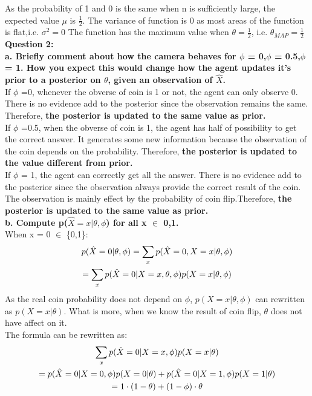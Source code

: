 \documentclass{article}
\begin{document}
As the probability of 1 and 0 is the same when n is sufficiently large, the expected value \textbf{$\mu$} is $\frac{1}{2}$. The  variance of function is 0 as most areas of the function is flat,i.e. $\sigma^2 = 0$ The function has the maximum value when $\theta = \frac{1}{2}$, i.e. \textbf{$\theta_{MAP} = \frac{1}{2}$ }\\

\textbf{Question 2:}\\
\textbf{a.  Briefly comment about how the camera behaves for $\phi$ = 0,$\phi$ = 0.5,$\phi$ = 1. How you
expect this would change how the agent updates it’s prior to a posterior on $\theta$, given an observation of $\hat{X}$.}\\
If $\phi$ =0, whenever the obverse of coin is 1 or not, the agent can only observe 0. There is no evidence add to the posterior since the observation remains the same. Therefore, \textbf{the posterior is updated to the same value as prior.}\\
If $\phi$ =0.5, when the obverse of coin is 1, the agent has half of possibility to get the correct answer. It generates some new information because the observation of the coin depends on the probability. Therefore, \textbf{the posterior is updated to the value different from prior.}\\
If $\phi$ = 1, the agent can correctly get all the answer. There is no evidence add to the posterior since the observation always provide the correct result of the coin. The observation is mainly effect by the probability of coin flip.Therefore, \textbf{the posterior is updated to the same value as prior.} \\

\textbf{b. Compute p($\hat{X} = x|\theta, \phi$) for all x $\in$ {0,1}.}\\
When x = 0 $\in$ \{0,1\}:
\begin{gather}
p(\hat{X} = 0|\theta, \phi) = \sum_x{p(\hat{X} = 0, X = x|\theta, \phi) } \notag \\ \notag = \sum_x{p(\hat{X} = 0|X= x,\theta,\phi)p(X=x|\theta,\phi)}
\end{gather}
As the real coin probability does not depend on $\phi$, $p(X=x|\theta,\phi)$ can rewritten as $p(X=x|\theta)$. What is more, when we know the result of coin flip, $\theta$ does not have affect on it. \\

The formula can be rewritten as:\\
\begin{gather}
\sum_x{p(\hat{X} = 0|X= x,\phi)p(X=x|\theta)} \notag \\
= p(\hat{X} = 0 | X = 0,\phi)p(X = 0| \theta) + p(\hat{X} = 0 | X = 1,\phi)p(X = 1| \theta) \notag \\
= 1 \cdot (1-\theta) + (1-\phi) \cdot \theta
\end{gather}
\end{document}
